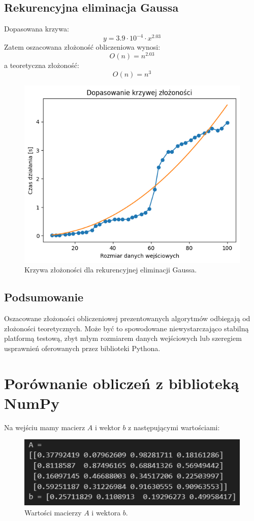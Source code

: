 \documentclass[11pt, leqno]{scrartcl}
\begin{document}
    \subsection{Rekurencyjna eliminacja Gaussa}
    Dopasowana krzywa:
    \[
        y=3.9 \cdot 10^{-4} \cdot x^{2.03}
    \]
    Zatem oszacowana złożoność obliczeniowa wynosi:
    \[
        O(n)=n^{2.03}
    \]
    a teoretyczna złożoność:
    \[
        O(n)=n^3
    \]
    \begin{figure}[H]
        \centering
        \includegraphics[width=0.7\linewidth]{zlozonosc_gauss.png}
        \caption{Krzywa złożoności dla rekurencyjnej eliminacji
            Gaussa.}
    \end{figure}

    \subsection{Podsumowanie}
    Oszacowane złożoności obliczeniowej prezentowanych algorytmów
    odbiegają od złożoności teoretycznych. Może być to spowodowane
    niewystarczająco stabilną platformą testową, zbyt młym rozmiarem
    danych wejściowych lub szeregiem usprawnień oferowanych przez
    biblioteki Pythona.

    \section{Porównanie obliczeń z biblioteką NumPy}
    Na wejściu mamy macierz $A$ i wektor $b$ z następującymi
    wartościami:
    \begin{figure}[H]
        \centering
        \includegraphics[width=0.7\linewidth]{porownanie_wejscie2.png}
        \caption{Wartości macierzy $A$ i wektora $b$.}
    \end{figure}
\end{document}
